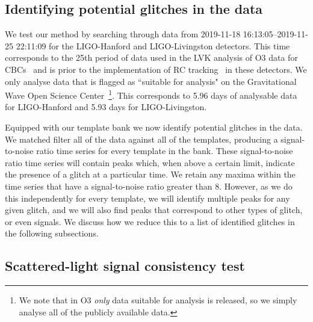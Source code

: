 \subsection{Identifying potential \scl{} glitches in the data}

We test our method by searching through \gw{} data from 2019-11-18 16:13:05--2019-11-25 22:11:09 for the LIGO-Hanford and LIGO-Livingston detectors. This time corresponds to the 25th period of data used in the LVK analysis of O3 data for CBCs~\cite{gwtc3:2023} and is prior to the implementation of RC tracking~\cite{reducing_scattering:2020} in these detectors. We only analyse data that is flagged as ``suitable for analysis" on the Gravitational Wave Open Science Center~\cite{GWOSC:2021}\footnote{We note that in O3 \emph{only} data suitable for analysis is released, so we simply analyse all of the publicly available data.}. This corresponds to 5.96 days of analysable data for LIGO-Hanford and 5.93 days for LIGO-Livingston.

Equipped with our template bank we now identify potential \scl{} glitches in the data. We matched filter all of the data against all of the templates, producing a signal-to-noise ratio time series for every template in the bank. These signal-to-noise ratio time series will contain peaks which, when above a certain limit, indicate the presence of a \scl{} glitch at a particular time. We retain any maxima within the time series that have a signal-to-noise ratio greater than 8. However, as we do this independently for every template, we will identify multiple peaks for any given glitch, and we will also find peaks that correspond to other types of glitch, or even \gw{} signals. We discuss how we reduce this to a list of identified \scl{} glitches in the following subsections.

\subsection{Scattered-light signal consistency test}

